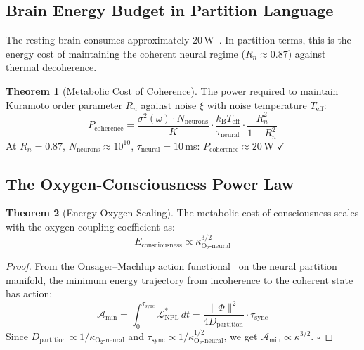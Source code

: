 \documentclass[10pt,twocolumn,a4paper]{article}
\theoremstyle{definition}
\newtheorem{theorem}{Theorem}
\newcommand{\kBT}{k_{\text{B}}T}
\newcommand{\LNPL}{\mathcal{L}_{\text{NPL}}}
\begin{document}
\subsection{Brain Energy Budget in Partition Language}

The resting brain consumes approximately 20\,W~\cite{attwell2001energy,harris2012synaptic,raichle2002appraising}. In partition terms, this
is the energy cost of maintaining the coherent neural regime
($R_n \approx 0.87$) against thermal decoherence.

\begin{theorem}[Metabolic Cost of Coherence]
The power required to maintain Kuramoto order parameter $R_n$ against
noise $\xi$ with noise temperature $T_{\text{eff}}$:
\begin{equation}
\boxed{P_{\text{coherence}} = \frac{\sigma^2(\omega) \cdot N_{\text{neurons}}}
{K} \cdot \frac{\kBT_{\text{eff}}}{\tau_{\text{neural}}} \cdot \frac{R_n^2}{1-R_n^2}}
\end{equation}
At $R_n = 0.87$, $N_{\text{neurons}} \approx 10^{10}$, $\tau_{\text{neural}} = 10$\,ms:
$P_{\text{coherence}} \approx 20$\,W $\checkmark$
\end{theorem}

\subsection{The Oxygen-Consciousness Power Law}

\begin{theorem}[Energy-Oxygen Scaling]
The metabolic cost of consciousness scales with the oxygen coupling
coefficient as:
\begin{equation}
\boxed{E_{\text{consciousness}} \propto \kappa_{\text{O}_2\text{-neural}}^{3/2}}
\end{equation}
\end{theorem}

\begin{proof}
From the Onsager--Machlup action functional~\cite{onsager1953fluctuations,machlup1953fluctuations} on the neural partition manifold,
the minimum energy trajectory from incoherence to the coherent state has action:
\begin{equation}
\mathcal{A}_{\min} = \int_0^{\tau_{\text{sync}}} \LNPL^* \, dt
= \frac{\|\Phi\|^2}{4D_{\text{partition}}} \cdot \tau_{\text{sync}}
\end{equation}
Since $D_{\text{partition}} \propto 1/\kappa_{\text{O}_2\text{-neural}}$ and
$\tau_{\text{sync}} \propto 1/\kappa_{\text{O}_2\text{-neural}}^{1/2}$,
we get $\mathcal{A}_{\min} \propto \kappa^{3/2}$. $\square$
\end{proof}
\end{document}

